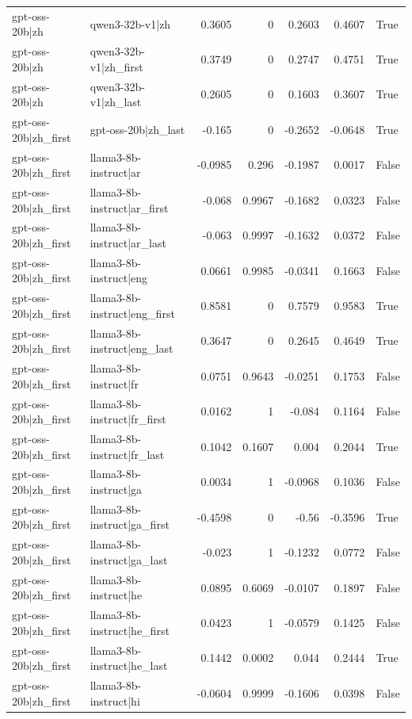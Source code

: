 \begin{table}
\begin{tabular}{l l r r r r l}
gpt-oss-20b|zh & qwen3-32b-v1|zh & 0.3605 & 0 & 0.2603 & 0.4607 & True \\
gpt-oss-20b|zh & qwen3-32b-v1|zh_first & 0.3749 & 0 & 0.2747 & 0.4751 & True \\
gpt-oss-20b|zh & qwen3-32b-v1|zh_last & 0.2605 & 0 & 0.1603 & 0.3607 & True \\
gpt-oss-20b|zh_first & gpt-oss-20b|zh_last & -0.165 & 0 & -0.2652 & -0.0648 & True \\
gpt-oss-20b|zh_first & llama3-8b-instruct|ar & -0.0985 & 0.296 & -0.1987 & 0.0017 & False \\
gpt-oss-20b|zh_first & llama3-8b-instruct|ar_first & -0.068 & 0.9967 & -0.1682 & 0.0323 & False \\
gpt-oss-20b|zh_first & llama3-8b-instruct|ar_last & -0.063 & 0.9997 & -0.1632 & 0.0372 & False \\
gpt-oss-20b|zh_first & llama3-8b-instruct|eng & 0.0661 & 0.9985 & -0.0341 & 0.1663 & False \\
gpt-oss-20b|zh_first & llama3-8b-instruct|eng_first & 0.8581 & 0 & 0.7579 & 0.9583 & True \\
gpt-oss-20b|zh_first & llama3-8b-instruct|eng_last & 0.3647 & 0 & 0.2645 & 0.4649 & True \\
gpt-oss-20b|zh_first & llama3-8b-instruct|fr & 0.0751 & 0.9643 & -0.0251 & 0.1753 & False \\
gpt-oss-20b|zh_first & llama3-8b-instruct|fr_first & 0.0162 & 1 & -0.084 & 0.1164 & False \\
gpt-oss-20b|zh_first & llama3-8b-instruct|fr_last & 0.1042 & 0.1607 & 0.004 & 0.2044 & True \\
gpt-oss-20b|zh_first & llama3-8b-instruct|ga & 0.0034 & 1 & -0.0968 & 0.1036 & False \\
gpt-oss-20b|zh_first & llama3-8b-instruct|ga_first & -0.4598 & 0 & -0.56 & -0.3596 & True \\
gpt-oss-20b|zh_first & llama3-8b-instruct|ga_last & -0.023 & 1 & -0.1232 & 0.0772 & False \\
gpt-oss-20b|zh_first & llama3-8b-instruct|he & 0.0895 & 0.6069 & -0.0107 & 0.1897 & False \\
gpt-oss-20b|zh_first & llama3-8b-instruct|he_first & 0.0423 & 1 & -0.0579 & 0.1425 & False \\
gpt-oss-20b|zh_first & llama3-8b-instruct|he_last & 0.1442 & 0.0002 & 0.044 & 0.2444 & True \\
gpt-oss-20b|zh_first & llama3-8b-instruct|hi & -0.0604 & 0.9999 & -0.1606 & 0.0398 & False \\

\end{tabular}
\end{table}

